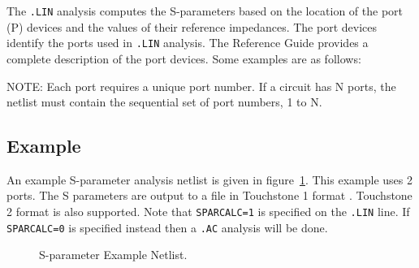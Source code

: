 The \verb|.LIN| analysis computes the S-parameters based on the
location of the port (P) devices and the values of their reference
impedances. The port devices identify the ports used in \verb|.LIN|
analysis. The \Xyce{} Reference Guide\ReferenceGuide{} provides a
complete description of the port devices. Some examples are as
follows:


NOTE: Each port requires a unique port number. If a circuit has N
ports, the netlist must contain the sequential set of port numbers, 1
to N.

\subsection{Example}
An example S-parameter analysis netlist is given in
figure~\ref{spExample}.  This example uses 2 ports.  The S parameters
are output to a file in Touchstone 1 format
\cite{touchstone2_std_2009}.  Touchstone 2 format is also supported.
Note that \texttt{SPARCALC=1} is specified on the \texttt{.LIN} line.
If \texttt{SPARCALC=0} is specified instead then a \texttt{.AC}
analysis will be done.

\begin{figure}[htbp]
  \begin{centering}
\caption[S-parameter Example Netlist]
{S-parameter Example Netlist.  \label{spExample} }
\end{centering}
\end{figure}

